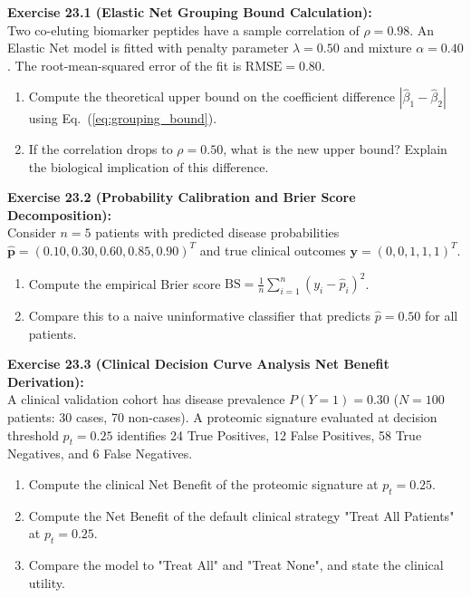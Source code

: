 \documentclass[11pt,oneside]{book}
\begin{document}
\noindent
\textbf{Exercise 23.1 (Elastic Net Grouping Bound Calculation):}\\
Two co-eluting biomarker peptides have a sample correlation of $\rho = 0.98$. An Elastic Net model is fitted with penalty parameter $\lambda = 0.50$ and mixture $\alpha = 0.40$. The root-mean-squared error of the fit is $\text{RMSE} = 0.80$.
\begin{enumerate}
    \item Compute the theoretical upper bound on the coefficient difference $|\hat{\beta}_1 - \hat{\beta}_2|$ using Eq.~(\ref{eq:grouping_bound}).
    \item If the correlation drops to $\rho = 0.50$, what is the new upper bound? Explain the biological implication of this difference.
\end{enumerate}

\vspace{0.4em}
\noindent
\textbf{Exercise 23.2 (Probability Calibration and Brier Score Decomposition):}\\
Consider $n = 5$ patients with predicted disease probabilities $\hat{\mathbf{p}} = (0.10, 0.30, 0.60, 0.85, 0.90)^T$ and true clinical outcomes $\mathbf{y} = (0, 0, 1, 1, 1)^T$.
\begin{enumerate}
    \item Compute the empirical Brier score $\text{BS} = \frac{1}{n} \sum_{i=1}^n (y_i - \hat{p}_i)^2$.
    \item Compare this to a naive uninformative classifier that predicts $\hat{p} = 0.50$ for all patients.
\end{enumerate}

\vspace{0.4em}
\noindent
\textbf{Exercise 23.3 (Clinical Decision Curve Analysis Net Benefit Derivation):}\\
A clinical validation cohort has disease prevalence $P(Y=1) = 0.30$ ($N = 100$ patients: 30 cases, 70 non-cases). A proteomic signature evaluated at decision threshold $p_t = 0.25$ identifies 24 True Positives, 12 False Positives, 58 True Negatives, and 6 False Negatives.
\begin{enumerate}
    \item Compute the clinical Net Benefit of the proteomic signature at $p_t = 0.25$.
    \item Compute the Net Benefit of the default clinical strategy "Treat All Patients" at $p_t = 0.25$.
    \item Compare the model to "Treat All" and "Treat None", and state the clinical utility.
\end{enumerate}
\end{document}
